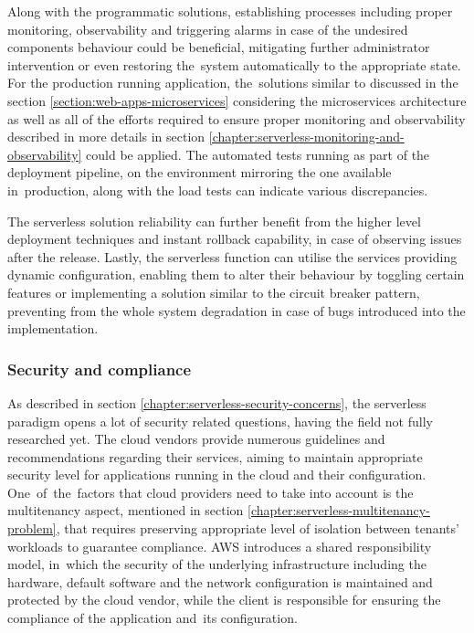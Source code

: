 Along with the programmatic solutions, establishing processes including proper monitoring, observability and triggering alarms in case of the undesired components behaviour could be beneficial, mitigating further administrator intervention or even restoring the~system automatically to the appropriate state.
For the production running application, the~solutions similar to discussed in the section \ref{section:web-apps-microservices} considering the microservices architecture as well as all of the efforts required to ensure proper monitoring and observability described in more details in section \ref{chapter:serverless-monitoring-and-observability} could be applied.
The automated tests running as part of the deployment pipeline, on the environment mirroring the one available in~production, along with the load tests can indicate various discrepancies.

The serverless solution reliability can further benefit from the higher level deployment techniques and instant rollback capability, in case of observing issues after the release. Lastly, the serverless function can utilise the services providing dynamic configuration, enabling them to alter their behaviour by toggling certain features or implementing a solution similar to the circuit breaker pattern, preventing from the whole system degradation in case of bugs introduced into the implementation.

\subsubsection{Security and compliance} \label{chapter:serverless-suitability-security-and-compliance}

As described in section \ref{chapter:serverless-security-concerns}, the serverless paradigm opens a lot of security related questions, having the field not fully researched yet. The cloud vendors provide numerous guidelines and recommendations regarding their services, aiming to maintain appropriate security level for applications running in the cloud and their configuration.
One~of~the~factors that cloud providers need to take into account is the multitenancy aspect, mentioned in section \ref{chapter:serverless-multitenancy-problem}, that requires preserving appropriate level of isolation between tenants' workloads to guarantee compliance.
AWS introduces a shared responsibility model, in~which the security of the underlying infrastructure including the hardware, default software and the network configuration is maintained and protected by the cloud vendor, while the client is responsible for ensuring the compliance of the application and~its configuration.

